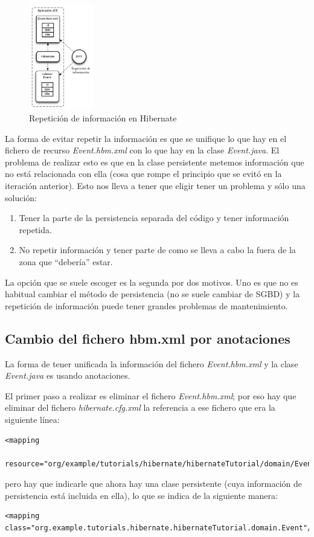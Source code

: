 \documentclass{article}
\begin{document}
\begin{figure}[h]
  \centering
    \includegraphics[width=0.25\textwidth]{commit03/img/Dry.pdf}
  \caption{Repetición de información en Hibernate}
  \label{fig:c03:Dry}
\end{figure}	

	La forma de evitar repetir la información es que se unifique lo que hay en el fichero de recurso \emph{Event.hbm.xml} con lo que hay en la clase \emph{Event.java}. El problema de realizar esto es que en la clase persistente metemos información que no está relacionada con ella (cosa que rompe el principio que se evitó en la iteración anterior). Esto nos lleva a tener que eligir tener un problema y sólo una solución:
{\setlength{\parskip}{0mm}
\begin{enumerate}
	\item Tener la parte de la persistencia separada del código y tener información repetida.
	\item No repetir información y tener parte de como se lleva a cabo la fuera de la zona que ``debería'' estar.
\end{enumerate}
}
	La opción que se suele escoger es la segunda por dos motivos. Uno es que no es habitual cambiar el método de persistencia (no se suele cambiar de SGBD) y la repetición de información puede tener grandes problemas de mantenimiento.
	
\subsection{Cambio del fichero hbm.xml por anotaciones}
	La forma de tener unificada la información del fichero \emph{Event.hbm.xml} y la clase \emph{Event.java} es usando anotaciones.
	
	El primer paso a realizar es eliminar el fichero \emph{Event.hbm.xml}; por eso hay que eliminar del fichero \emph{hibernate.cfg.xml} la referencia a ese fichero que era la siguiente línea:
\begin{lstlisting}[style=xml]
<mapping
    resource="org/example/tutorials/hibernate/hibernateTutorial/domain/Event.hbm.xml"/>
\end{lstlisting}
pero hay que indicarle que ahora hay una clase persistente (cuya información de persistencia está incluida en ella), lo que se indica de la siguiente manera:
\begin{lstlisting}[style=xml]
<mapping class="org.example.tutorials.hibernate.hibernateTutorial.domain.Event"/>
\end{lstlisting}
\end{document}
